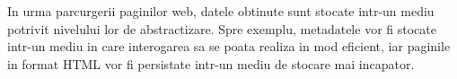 In urma parcurgerii paginilor web, datele obtinute sunt stocate intr-un mediu potrivit nivelului lor de abstractizare. Spre exemplu, metadatele vor fi stocate intr-un mediu in care interogarea sa se poata realiza in mod eficient, iar paginile in format HTML vor fi persistate intr-un mediu de stocare mai incapator.
\\